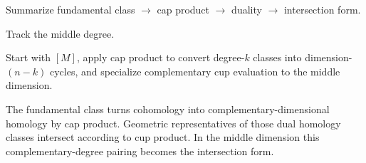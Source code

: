\begin{exercise}\label{exr:viii33-24}
Summarize fundamental class $\to$ cap product $\to$ duality $\to$ intersection form.
\end{exercise}
\begin{hint}
Track the middle degree.

Start with \([M]\), apply cap product to convert degree-\(k\) classes into dimension-\((n-k)\) cycles, and specialize complementary cup evaluation to the middle dimension.
\end{hint}
\begin{solution}
The fundamental class turns cohomology into complementary-dimensional homology by cap product. Geometric representatives of those dual homology classes intersect according to cup product. In the middle dimension this complementary-degree pairing becomes the intersection form.
\end{solution}
